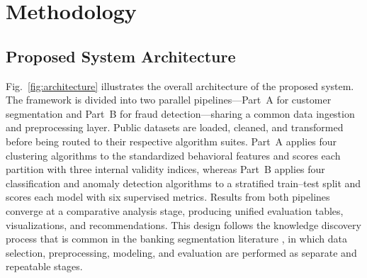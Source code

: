 \documentclass[conference]{IEEEtran}
\begin{document}
\section{Methodology}
\label{sec:methodology}

\subsection{Proposed System Architecture}

Fig.~\ref{fig:architecture} illustrates the overall architecture of the proposed system. The framework is divided into two parallel pipelines---Part~A for customer segmentation and Part~B for fraud detection---sharing a common data ingestion and preprocessing layer. Public datasets are loaded, cleaned, and transformed before being routed to their respective algorithm suites. Part~A applies four clustering algorithms to the standardized behavioral features and scores each partition with three internal validity indices, whereas Part~B applies four classification and anomaly detection algorithms to a stratified train--test split and scores each model with six supervised metrics. Results from both pipelines converge at a comparative analysis stage, producing unified evaluation tables, visualizations, and recommendations. This design follows the knowledge discovery process that is common in the banking segmentation literature \cite{aryuni2018,han2011data}, in which data selection, preprocessing, modeling, and evaluation are performed as separate and repeatable stages.
\end{document}
